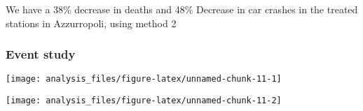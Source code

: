 \documentclass[
]{article}
\begin{document}
We have a 38\% decrease in deaths and 48\% Decrease in car crashes in
the treated stations in Azzurropoli, using method 2

\hypertarget{event-study-1}{%
\subsubsection{Event study}\label{event-study-1}}

\begin{center}\texttt{[image: analysis\_files/figure-latex/unnamed-chunk-11-1]} \end{center}

\begin{center}\texttt{[image: analysis\_files/figure-latex/unnamed-chunk-11-2]} \end{center}
\end{document}
